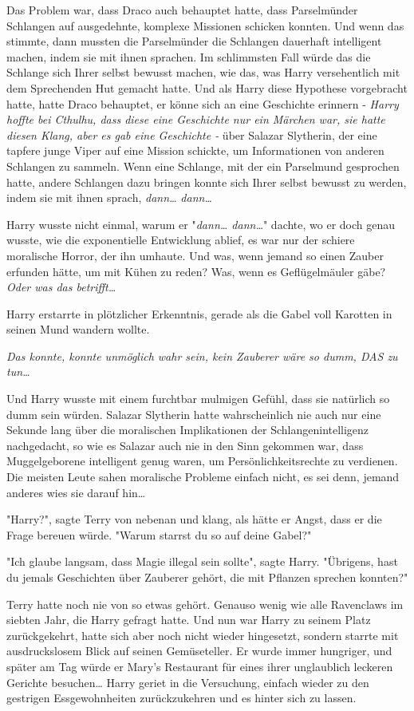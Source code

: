 {Das Problem war, dass Draco auch behauptet hatte, dass Parselmünder Schlangen auf ausgedehnte, komplexe Missionen schicken konnten. Und wenn das stimmte, dann mussten die Parselmünder die Schlangen dauerhaft intelligent machen, indem sie mit ihnen sprachen. Im schlimmsten Fall würde das die Schlange sich Ihrer selbst bewusst machen, wie das, was Harry versehentlich mit dem Sprechenden Hut gemacht hatte. Und als Harry diese Hypothese vorgebracht hatte, hatte Draco behauptet, er könne sich an eine Geschichte erinnern - \emph{Harry hoffte bei Cthulhu, dass diese eine Geschichte nur ein Märchen war, sie hatte diesen Klang, aber es gab eine Geschichte -} über Salazar Slytherin, der eine tapfere junge Viper auf eine Mission schickte, um Informationen von anderen Schlangen zu sammeln. Wenn eine Schlange, mit der ein Parselmund gesprochen hatte, andere Schlangen dazu bringen konnte sich Ihrer selbst bewusst zu werden, indem sie mit ihnen sprach, \emph{dann…} \emph{dann…}

Harry wusste nicht einmal, warum er "\emph{dann… dann…}" dachte, wo er doch genau wusste, wie die exponentielle Entwicklung ablief, es war nur der schiere moralische Horror, der ihn umhaute. Und was, wenn jemand so einen Zauber erfunden hätte, um mit Kühen zu reden? Was, wenn es Geflügelmäuler gäbe? \emph{Oder was das betrifft…}

Harry erstarrte in plötzlicher Erkenntnis, gerade als die Gabel voll Karotten in seinen Mund wandern wollte.

\emph{Das konnte, konnte unmöglich wahr sein, kein Zauberer wäre so dumm, DAS zu tun…}

Und Harry wusste mit einem furchtbar mulmigen Gefühl, dass sie natürlich so dumm sein würden. Salazar Slytherin hatte wahrscheinlich nie auch nur eine Sekunde lang über die moralischen Implikationen der Schlangenintelligenz nachgedacht, so wie es Salazar auch nie in den Sinn gekommen war, dass Muggelgeborene intelligent genug waren, um Persönlichkeitsrechte zu verdienen. Die meisten Leute sahen moralische Probleme einfach nicht, es sei denn, jemand anderes wies sie darauf hin…

"Harry?", sagte Terry von nebenan und klang, als hätte er Angst, dass er die Frage bereuen würde. "Warum starrst du so auf deine Gabel?"

"Ich glaube langsam, dass Magie illegal sein sollte", sagte Harry. "Übrigens, hast du jemals Geschichten über Zauberer gehört, die mit Pflanzen sprechen konnten?"

Terry hatte noch nie von so etwas gehört. Genauso wenig wie alle Ravenclaws im siebten Jahr, die Harry gefragt hatte. Und nun war Harry zu seinem Platz zurückgekehrt, hatte sich aber noch nicht wieder hingesetzt, sondern starrte mit ausdruckslosem Blick auf seinen Gemüseteller. Er wurde immer hungriger, und später am Tag würde er Mary's Restaurant für eines ihrer unglaublich leckeren Gerichte besuchen… Harry geriet in die Versuchung, einfach wieder zu den gestrigen Essgewohnheiten zurückzukehren und es hinter sich zu lassen.

}
